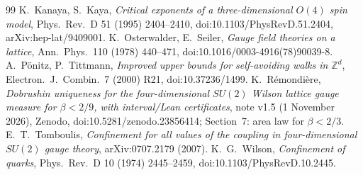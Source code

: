 \documentclass[11pt,a4paper]{article}
\theoremstyle{plain}
\theoremstyle{remark}
\numberwithin{equation}{section}
\newcommand{\Z}{\mathbb{Z}}
\begin{document}
\begin{thebibliography}{99}
 K.~Kanaya, S.~Kaya, \emph{Critical exponents of a three-dimensional $O(4)$ spin model}, Phys.\ Rev.\ D 51 (1995)
2404--2410, doi:10.1103/PhysRevD.51.2404, arXiv:hep-lat/9409001.
 K.~Osterwalder, E.~Seiler, \emph{Gauge field theories on a lattice}, Ann.\ Phys.\ 110 (1978) 440--471,
doi:10.1016/0003-4916(78)90039-8.
 A.~P\"onitz, P.~Tittmann, \emph{Improved upper bounds for self-avoiding walks in $\Z^d$}, Electron.\ J.\ Combin.\ 7
(2000) R21, doi:10.37236/1499.
 K.~R\'emondi\`ere, \emph{Dobrushin uniqueness for the four-dimensional $SU(2)$ Wilson lattice gauge measure for
$\beta<2/9$, with interval/Lean certificates}, note v1.5 (1 November 2026), Zenodo, doi:10.5281/zenodo.23856414; Section~7: area law
for $\beta<2/3$.
 E.~T.~Tomboulis, \emph{Confinement for all values of the coupling in four-dimensional $SU(2)$ gauge theory},
arXiv:0707.2179 (2007).
 K.~G.~Wilson, \emph{Confinement of quarks}, Phys.\ Rev.\ D 10 (1974) 2445--2459, doi:10.1103/PhysRevD.10.2445.
\end{thebibliography}
\end{document}
